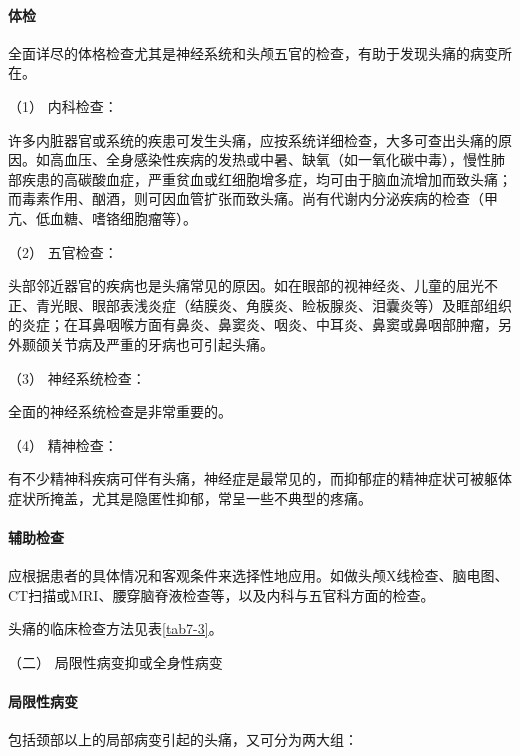 \paragraph{体检}

全面详尽的体格检查尤其是神经系统和头颅五官的检查，有助于发现头痛的病变所在。

\hypertarget{text00020.htmlux5cux23CHP1-7-2-1-2-1}{}
（1） 内科检查：

许多内脏器官或系统的疾患可发生头痛，应按系统详细检查，大多可查出头痛的原因。如高血压、全身感染性疾病的发热或中暑、缺氧（如一氧化碳中毒），慢性肺部疾患的高碳酸血症，严重贫血或红细胞增多症，均可由于脑血流增加而致头痛；而毒素作用、酗酒，则可因血管扩张而致头痛。尚有代谢内分泌疾病的检查（甲亢、低血糖、嗜铬细胞瘤等）。

\hypertarget{text00020.htmlux5cux23CHP1-7-2-1-2-2}{}
（2） 五官检查：

头部邻近器官的疾病也是头痛常见的原因。如在眼部的视神经炎、儿童的屈光不正、青光眼、眼部表浅炎症（结膜炎、角膜炎、睑板腺炎、泪囊炎等）及眶部组织的炎症；在耳鼻咽喉方面有鼻炎、鼻窦炎、咽炎、中耳炎、鼻窦或鼻咽部肿瘤，另外颞颌关节病及严重的牙病也可引起头痛。

\hypertarget{text00020.htmlux5cux23CHP1-7-2-1-2-3}{}
（3） 神经系统检查：

全面的神经系统检查是非常重要的。

\hypertarget{text00020.htmlux5cux23CHP1-7-2-1-2-4}{}
（4） 精神检查：

有不少精神科疾病可伴有头痛，神经症是最常见的，而抑郁症的精神症状可被躯体症状所掩盖，尤其是隐匿性抑郁，常呈一些不典型的疼痛。

\paragraph{辅助检查}

应根据患者的具体情况和客观条件来选择性地应用。如做头颅X线检查、脑电图、CT扫描或MRI、腰穿脑脊液检查等，以及内科与五官科方面的检查。

头痛的临床检查方法见表\ref{tab7-3}。

\hypertarget{text00020.htmlux5cux23CHP1-7-2-2}{}
（二） 局限性病变抑或全身性病变

\paragraph{局限性病变}

包括颈部以上的局部病变引起的头痛，又可分为两大组：

